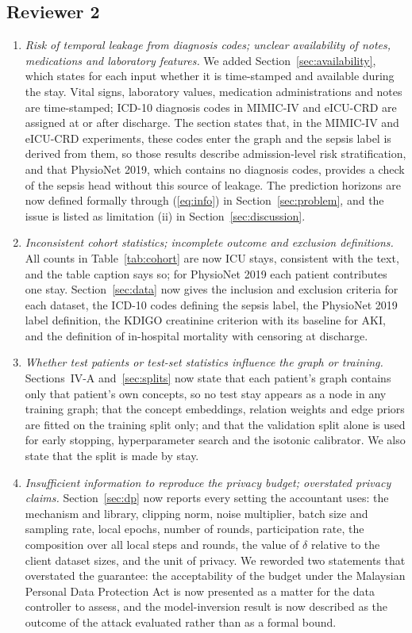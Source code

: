 \documentclass[conference]{IEEEtran}
\begin{document}
\subsection*{Reviewer 2}
\begin{enumerate}
\item \textit{Risk of temporal leakage from diagnosis codes; unclear availability of notes, medications and laboratory features.} We added Section~\ref{sec:availability}, which states for each input whether it is time-stamped and available during the stay. Vital signs, laboratory values, medication administrations and notes are time-stamped; ICD-10 diagnosis codes in MIMIC-IV and eICU-CRD are assigned at or after discharge. The section states that, in the MIMIC-IV and eICU-CRD experiments, these codes enter the graph and the sepsis label is derived from them, so those results describe admission-level risk stratification, and that PhysioNet 2019, which contains no diagnosis codes, provides a check of the sepsis head without this source of leakage. The prediction horizons are now defined formally through (\ref{eq:info}) in Section~\ref{sec:problem}, and the issue is listed as limitation (ii) in Section~\ref{sec:discussion}.
\item \textit{Inconsistent cohort statistics; incomplete outcome and exclusion definitions.} All counts in Table~\ref{tab:cohort} are now ICU stays, consistent with the text, and the table caption says so; for PhysioNet 2019 each patient contributes one stay. Section~\ref{sec:data} now gives the inclusion and exclusion criteria for each dataset, the ICD-10 codes defining the sepsis label, the PhysioNet 2019 label definition, the KDIGO creatinine criterion with its baseline for AKI, and the definition of in-hospital mortality with censoring at discharge.
\item \textit{Whether test patients or test-set statistics influence the graph or training.} Sections~IV-A and~\ref{sec:splits} now state that each patient's graph contains only that patient's own concepts, so no test stay appears as a node in any training graph; that the concept embeddings, relation weights and edge priors are fitted on the training split only; and that the validation split alone is used for early stopping, hyperparameter search and the isotonic calibrator. We also state that the split is made by stay.
\item \textit{Insufficient information to reproduce the privacy budget; overstated privacy claims.} Section~\ref{sec:dp} now reports every setting the accountant uses: the mechanism and library, clipping norm, noise multiplier, batch size and sampling rate, local epochs, number of rounds, participation rate, the composition over all local steps and rounds, the value of $\delta$ relative to the client dataset sizes, and the unit of privacy. We reworded two statements that overstated the guarantee: the acceptability of the budget under the Malaysian Personal Data Protection Act is now presented as a matter for the data controller to assess, and the model-inversion result is now described as the outcome of the attack evaluated rather than as a formal bound.

\end{enumerate}
\end{document}
